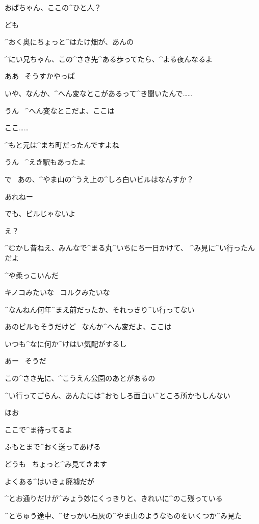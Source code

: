 \Ayase おばちゃん、ここの^{ひと}{人}？

\Ayase ども

\Person ^{おく}{奥}にちょっと^{はたけ}{畑}が、あんの

\Person ^{にい}{兄}ちゃん、この^{さき}{先}^{ある}{歩}ってたら、^{よる}{夜}んなるよ

\Ayase ああ
\ そうすかやっぱ

\Ayase いや、なんか、^{へん}{変}なとこがあるって^{き}{聞}いたんで……

\Person うん
\ ^{へん}{変}なとこだよ、ここは

\Ayase ここ……

\Ayase ^{もと}{元}は^{まち}{町}だったんですよね

\Person うん
\ ^{えき}{駅}もあったよ

\page
\Ayase で
\ あの、^{やま}{山}の^{うえ}{上}の^{しろ}{白}いビルはなんすか？

\Person あれねー

\Person でも、ビルじゃないよ

\Ayase え？

\Person ^{むかし}{昔}ねえ、みんなで^{まる}{丸}^{いちにち}{一日}かけて、
^{み}{見}に^{い}{行}ったんだよ

\Person ^{や}{柔}っこいんだ

\Person キノコみたいな
\ コルクみたいな

\Person ^{なんねん}{何年}^{まえ}{前}だったか、それっきり^{い}{行}ってない

\page
\Person あのビルもそうだけど
\ なんか^{へん}{変}だよ、ここは

\Person いつも^{なに}{何}か^{けはい}{気配}がするし

\Person あー
\ そうだ

\Person この^{さき}{先}に、^{こうえん}{公園}のあとがあるの

\Person ^{い}{行}ってごらん、あんたには^{おもしろ}{面白}い^{ところ}{所}かもしんない

\Ayase ほお

\Person ここで^{ま}{待}ってるよ

\Person ふもとまで^{おく}{送}ってあげる

\Ayase どうも
\ ちょっと^{み}{見}てきます

\page
\Ayase よくある^{はいきょ}{廃墟}だが

\Ayase ^{とお}{通}りだけが^{みょう}{妙}にくっきりと、きれいに^{のこ}{残}っている

\Ayase ^{とちゅう}{途中}、^{せっかい}{石灰}の^{やま}{山}のようなものをいくつか^{み}{見}た

